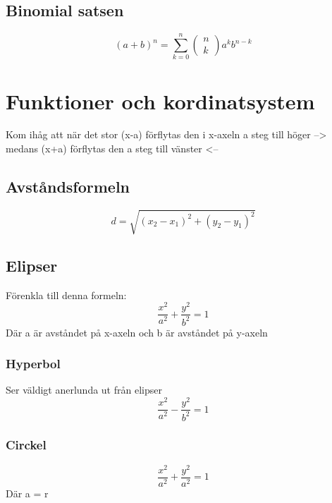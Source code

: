 \begin{multicols}{2}
\subsection{Binomial satsen}
\begin{equation}
(a + b)^{n} = \displaystyle\sum _ { k = 0 } ^ { n } \left( \begin{array} { l } { n } \\ { k } \end{array} \right) a ^ {k} b ^ { n - k }
\end{equation}


\newpage

\section{Funktioner och kordinatsystem}
Kom ihåg att när det stor (x-a) förflytas den i x-axeln a steg till höger --> medans (x+a) förflytas den a steg till vänster <-- 
\subsection{Avståndsformeln}
\begin{equation}
d = \sqrt { \left( x _ { 2 } - x _ { 1 } \right) ^ { 2 } + \left( y _ { 2 } - y _ { 1 } \right) ^ { 2 } }
\end{equation}


\subsection{Elipser}
Förenkla till denna formeln:
\begin{equation}
\frac { x ^ { 2 } } { a ^ { 2 } } + \frac { y ^ { 2 } } { b ^ { 2 } } = 1
\end{equation}
Där a är avståndet på x-axeln och b är avståndet på y-axeln


\subsubsection{Hyperbol}
Ser väldigt anerlunda ut från elipser
\begin{equation}
\frac { x ^ { 2 } } { a ^ { 2 } } - \frac { y ^ { 2 } } { b ^ { 2 } } = 1
\end{equation}


\subsubsection{Circkel}
\begin{equation}
\frac { x ^ { 2 } } { a ^ { 2 } } + \frac { y ^ { 2 } } { a ^ { 2 } } = 1
\end{equation}
Där a = r



\end{multicols}
